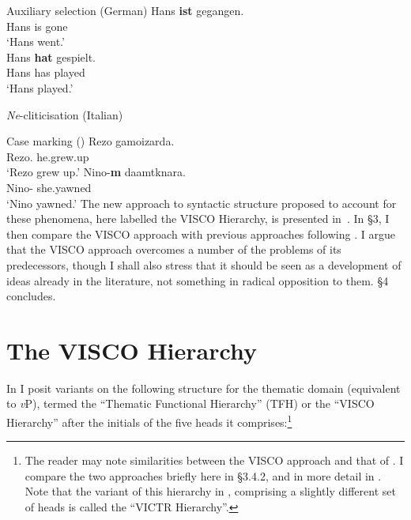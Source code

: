 \documentclass[output=paper]{langsci/langscibook}
\begin{document}
\ea Auxiliary selection (German)
    \ea
        \gll Hans \textbf{ist} gegangen.\\
            Hans is   gone\\
        \glt \enquote*{Hans went.}\\
    \ex
        \gll Hans \textbf{hat} gespielt.\\
        Hans has   played\\
        \glt \enquote*{Hans played.}\\
    \z
\z

\ea \emph{Ne}-cliticisation (Italian)
    \z
\z

\ea Case marking ()
    \ea
        \gll    Rezo   gamoizarda.\\
                Rezo.\Nom{}   he.grew.up\\
        \glt    \enquote*{Rezo grew up.}\hfill\parencite[293]{Harris1982}
    \ex
        \gll    Nino-\textbf{m} daamtknara.\\
                Nino-\Erg{} she.yawned\\
        \glt    \enquote*{Nino yawned.}\hfill\parencite[147]{Harris1981}
    \z
\z
The new approach to syntactic structure proposed to account for these
phenomena, here labelled the VISCO Hierarchy, is presented
in~.  In §3, I then compare the VISCO approach with previous
approaches  following  . I
argue that the VISCO approach overcomes a number of the problems of its
predecessors, though I shall also stress that it should be seen as a
development of ideas already in the literature, not something in radical
opposition to them. §4 concludes.

\section{The VISCO Hierarchy}\label{sec:visco}

In \textcite{Baker2016,Baker2018,Baker2019} I posit variants on the following
structure for the thematic domain (equivalent to \emph{v}P), termed the
\enquote{Thematic Functional Hierarchy} (\gls{TFH}) or the
\enquote{VISCO Hierarchy} after the initials of the five heads it
comprises:\footnote{The reader may note similarities between the VISCO approach
    and that of \citet{Ramchand2008}. I compare the two approaches briefly here
    in §3.4.2, and in more detail in \citet{Baker2018}. Note that the variant
of this hierarchy in \textcite{Baker2018}, comprising a slightly different
set of heads is called the \enquote{VICTR Hierarchy}.}
\end{document}
